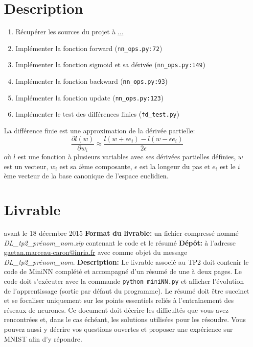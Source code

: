 \documentclass{article}
\begin{document}
\section{Description}
\begin{enumerate}
\item Récupérer les sources du projet à \url{...}
\item Implémenter la fonction forward (\texttt{nn\_ops.py:72})
\item Implémenter la fonction sigmoid et sa dérivée (\texttt{nn\_ops.py:149})
\item Implémenter la fonction backward (\texttt{nn\_ops.py:93})
\item Implémenter la fonction update (\texttt{nn\_ops.py:123})
\item Implémenter le test des différences finies (\texttt{fd\_test.py})
\end{enumerate}

La différence finie est une approximation de la dérivée partielle:
\begin{equation}
\frac{\partial l(w)}{\partial w_{i}} \approx \frac{l(w + \epsilon e_{i}) - l(w - \epsilon e_{i})}{2 \epsilon}
\end{equation}
où $l$ est une fonction à plusieurs variables avec ses dérivées partielles définies, $w$ est un vecteur, $w_{i}$ est sa $i$ème composante, $\epsilon$ est la longeur du pas et $e_{i}$ est le $i$ème vecteur de la base canonique de l'espace euclidien.

\section{Livrable}
 avant le 18 décembre 2015 \newline
{\bf Format du livrable:} un fichier compressé nommé {\it DL\_tp2\_prénom\_nom.zip} contenant le code et le résumé \newline
{\bf Dépôt:} à l'adresse \url{gaetan.marceau-caron@inria.fr} avec comme objet du message {\it DL\_tp2\_prénom\_nom}.\newline
{\bf Description:}\newline
Le livrable associé au TP2 doit contenir le code de MiniNN complété et accompagné d'un résumé de une à deux pages.
Le code doit s'exécuter avec la commande \texttt{python miniNN.py} et afficher l'évolution de l'apprentissage (sortie par défaut du programme).
Le résumé doit être succinct et se focaliser uniquement sur les points essentiels reliés à l'entraînement des réseaux de neurones.
Ce document doit décrire les difficultés que vous avez rencontrées et, dans le cas échéant, les solutions utilisées pour les résoudre.
Vous pouvez aussi y décrire vos questions ouvertes et proposer une expérience sur MNIST afin d'y répondre.     

\printbibliography
\end{document}
